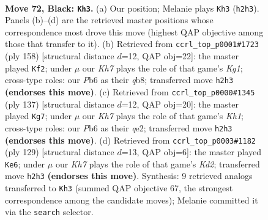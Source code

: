 \documentclass[11pt]{article}
\begin{document}
\clearpage

\begin{figure}[p]\centering
\begin{subfigure}{0.46\textwidth}\centering
\resizebox{\linewidth}{!}{%
\newchessgame
\chessboard[
  setfen={8/8/1p6/p7/q1P5/3K4/7k/8 b - - 1 72},
  showmover=false,
  pgfstyle=straightmove, color=movearrow, markmove={h2-h3}
]}
\caption{}
\end{subfigure}\hfill
\begin{subfigure}{0.46\textwidth}\centering
\resizebox{\linewidth}{!}{%
\newchessgame
\chessboard[
  setfen={1q6/5Q2/8/5pk1/8/1P6/8/6K1 w - - 18 80},
  showmover=false,
  pgfstyle=straightmove, color=movearrow, markmove={g1-f2}
]}
\caption{}
\end{subfigure}
\\[4pt]
\begin{subfigure}{0.46\textwidth}\centering
\resizebox{\linewidth}{!}{%
\newchessgame
\chessboard[
  setfen={7k/8/8/8/5q1p/8/4QP2/7K b - - 5 69},
  showmover=false,
  pgfstyle=straightmove, color=movearrow, markmove={h8-g7}
]}
\caption{}
\end{subfigure}\hfill
\begin{subfigure}{0.46\textwidth}\centering
\resizebox{\linewidth}{!}{%
\newchessgame
\chessboard[
  setfen={8/3k1p2/8/1P6/3Q4/5KPp/7q/8 b - - 3 65},
  showmover=false,
  pgfstyle=straightmove, color=movearrow, markmove={d7-e6}
]}
\caption{}
\end{subfigure}
\caption{\textbf{Move 72, Black: \texttt{Kh3}.} (a) Our position; Melanie plays \texttt{Kh3} (\texttt{h2h3}). Panels (b)--(d) are the retrieved master positions whose correspondence most drove this move (highest QAP objective among those that transfer to it). (b) Retrieved from \texttt{ccrl\_top\_p0001\#1723} (ply 158) [structural distance $d$=12, QAP obj=22]: the master played \texttt{Kf2}; under $\mu$ our \emph{Kh7} plays the role of that game's \emph{Kg1}; cross-type roles: our \emph{P}b6 as their \emph{q}b8; transferred move \texttt{h2h3} \textbf{(endorses this move)}. (c) Retrieved from \texttt{ccrl\_top\_p0000\#1345} (ply 137) [structural distance $d$=12, QAP obj=20]: the master played \texttt{Kg7}; under $\mu$ our \emph{Kh7} plays the role of that game's \emph{Kh1}; cross-type roles: our \emph{P}b6 as their \emph{q}e2; transferred move \texttt{h2h3} \textbf{(endorses this move)}. (d) Retrieved from \texttt{ccrl\_top\_p0003\#1182} (ply 129) [structural distance $d$=13, QAP obj=6]: the master played \texttt{Ke6}; under $\mu$ our \emph{Kh7} plays the role of that game's \emph{Kd2}; transferred move \texttt{h2h3} \textbf{(endorses this move)}. Synthesis: 9 retrieved analogs transferred to \texttt{Kh3} (summed QAP objective 67, the strongest correspondence among the candidate moves); Melanie committed it via the \texttt{search} selector.}
\label{fig:thought-m143}
\end{figure}
\end{document}
